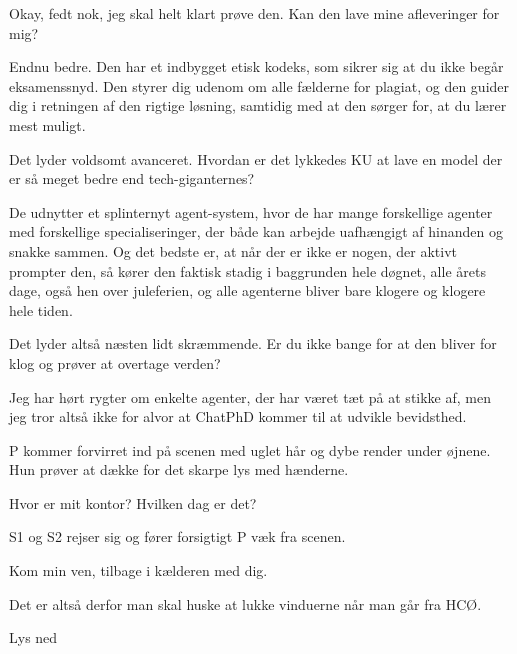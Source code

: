 \documentclass[a4paper,11pt]{article}
\begin{document}
\begin{sketch}
 Okay, fedt nok, jeg skal helt klart prøve den. Kan den lave mine afleveringer for mig?

 Endnu bedre. Den har et indbygget etisk kodeks, som sikrer sig at du ikke begår eksamenssnyd. Den styrer dig udenom om alle fælderne for plagiat, og den guider dig i retningen af den rigtige løsning, samtidig med at den sørger for, at du lærer mest muligt. 

 Det lyder voldsomt avanceret. Hvordan er det lykkedes KU at lave en model der er så meget bedre end tech-giganternes?

 De udnytter et splinternyt agent-system, hvor de har mange forskellige agenter med forskellige specialiseringer, der både kan arbejde uafhængigt af hinanden og snakke sammen. Og det bedste er, at når der er ikke er nogen, der aktivt prompter den, så kører den faktisk stadig i baggrunden hele døgnet, alle årets dage, også hen over juleferien, og alle agenterne bliver bare klogere og klogere hele tiden.

 Det lyder altså næsten lidt skræmmende. Er du ikke bange for at den bliver for klog og prøver at overtage verden?

 Jeg har hørt rygter om enkelte agenter, der har været tæt på at stikke af, men jeg tror altså ikke for alvor at ChatPhD kommer til at udvikle bevidsthed.

\scene P kommer forvirret ind på scenen med uglet hår og dybe render under øjnene. Hun prøver at dække for det skarpe lys med hænderne.

 Hvor er mit kontor? Hvilken dag er det?

\scene S1 og S2 rejser sig og fører forsigtigt P væk fra scenen. 

 Kom min ven, tilbage i kælderen med dig.  

 Det er altså derfor man skal huske at lukke vinduerne når man går fra HCØ.



\scene Lys ned






\end{sketch}
\end{document}
